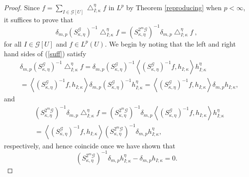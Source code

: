 \documentclass{amsart}%
\theoremstyle{plain}
\numberwithin{equation}{section}
\begin{document}
\begin{proof}
Since $f=\sum_{I\in\mathcal{G}\left[  U\right]  }\bigtriangleup_{I;\kappa
}^{\eta}f$ in $L^{p}$ by Theorem \ref{reproducing} when $p<\infty$, it
suffices to prove that%
\begin{equation}
\delta_{m,p}\left(  S_{\kappa,\eta}^{\mathcal{G}}\right)  ^{-1}\bigtriangleup
_{I;\kappa}^{\eta}f=\left(  S_{\kappa,\eta}^{2^{m}\mathcal{G}}\right)
^{-1}\delta_{m,p}\bigtriangleup_{I;\kappa}^{\eta}f\ ,\label{suff}%
\end{equation}
for all $I\in\mathcal{G}\left[  U\right]  $ and $f\in L^{p}\left(  U\right)
$. We begin by noting that the left and right hand sides of (\ref{suff})
satisfy
\begin{align*}
&  \delta_{m,p}\left(  S_{\kappa,\eta}^{\mathcal{G}}\right)  ^{-1}%
\bigtriangleup_{I;\kappa}^{\eta}f=\delta_{m,p}\left(  S_{\kappa,\eta
}^{\mathcal{G}}\right)  ^{-1}\left\langle \left(  S_{\kappa,\eta}%
^{\mathcal{G}}\right)  ^{-1}f,h_{I;\kappa}\right\rangle h_{I;\kappa}^{\eta}\\
&  =\left\langle \left(  S_{\kappa,\eta}^{\mathcal{G}}\right)  ^{-1}%
f,h_{I;\kappa}\right\rangle \delta_{m,p}\left(  S_{\kappa,\eta}^{\mathcal{G}%
}\right)  ^{-1}h_{I;\kappa}^{\eta}=\left\langle \left(  S_{\kappa,\eta
}^{\mathcal{G}}\right)  ^{-1}f,h_{I;\kappa}\right\rangle \delta_{m,p}%
h_{I;\kappa},
\end{align*}
and%
\begin{align*}
&  \left(  S_{\kappa,\eta}^{2^{m}\mathcal{G}}\right)  ^{-1}\delta
_{m,p}\bigtriangleup_{I;\kappa}^{\eta}f=\left(  S_{\kappa,\eta}^{2^{m}%
\mathcal{G}}\right)  ^{-1}\delta_{m,p}\left\langle \left(  S_{\kappa,\eta
}^{\mathcal{G}}\right)  ^{-1}f,h_{I;\kappa}\right\rangle h_{I;\kappa}^{\eta}\\
&  =\left\langle \left(  S_{\kappa,\eta}^{\mathcal{G}}\right)  ^{-1}%
f,h_{I;\kappa}\right\rangle \left(  S_{\kappa,\eta}^{2^{m}\mathcal{G}}\right)
^{-1}\delta_{m,p}h_{I;\kappa}^{\eta},
\end{align*}
respectively, and hence coincide once we have shown that%
\begin{equation}
\left(  S_{\kappa,\eta}^{2^{m}\mathcal{G}}\right)  ^{-1}\delta_{m,p}%
h_{I;\kappa}^{\eta}-\delta_{m,p}h_{I;\kappa}=0.\label{calc'}%
\end{equation}



\end{proof}
\end{document}
